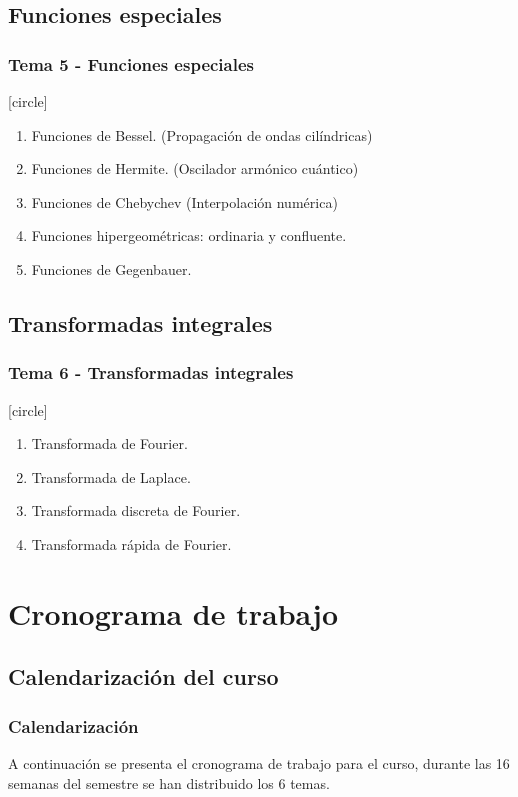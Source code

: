 \documentclass[12pt]{beamer}
\begin{document}
\subsection{Funciones especiales}

\begin{frame}
\frametitle{Tema 5 - Funciones especiales}
[circle]
\begin{enumerate}[<+->]
\item Funciones de Bessel. (Propagación de ondas cilíndricas)
\item Funciones de Hermite. (Oscilador armónico cuántico)
\item Funciones de Chebychev (Interpolación numérica)
\item Funciones hipergeométricas: ordinaria y confluente.
\item Funciones de Gegenbauer.
\end{enumerate}
\end{frame}
\subsection{Transformadas integrales}
\begin{frame}
\frametitle{Tema 6 - Transformadas integrales}
[circle]
\begin{enumerate}[<+->]
\item Transformada de Fourier.
\item Transformada de Laplace.
\item Transformada discreta de Fourier.
\item Transformada rápida de Fourier.
\end{enumerate}
\end{frame}

\section{Cronograma de trabajo}
\subsection{Calendarización del curso}

\begin{frame}
\frametitle{Calendarización}
A continuación se presenta el cronograma de trabajo para el curso, durante las 16 semanas del semestre se han distribuido los 6 temas.
\end{frame}
{

}
\end{document}
